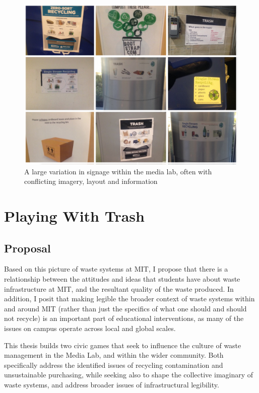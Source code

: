 \documentclass[nofonts,nols,justified,nobib]{tufte-book}
\begin{document}
\begin{figure}
\includegraphics[width=\textwidth]{img/2/signs-collage.jpg}
\caption{A large variation in signage within the media lab, often with conflicting imagery, layout and information}
\end{figure}



\chapter{Playing With Trash}

\section*{Proposal}
Based on this picture of waste systems at MIT, I propose that there is a relationship between the attitudes and ideas that students have about waste infrastructure at MIT, and the resultant quality of the waste produced. In addition, I posit that making legible the broader context of waste systems within and around MIT (rather than just the specifics of what one should and should not recycle) is an important part of educational interventions, as many of the issues on campus operate across local and global scales.

This thesis builds two civic games that seek to influence the culture of waste management in the Media Lab, and within the wider community. Both specifically address the identified issues of recycling contamination and unsustainable purchasing, while seeking also to shape the collective imaginary of waste systems, and address broader issues of infrastructural legibility. 
\end{document}
